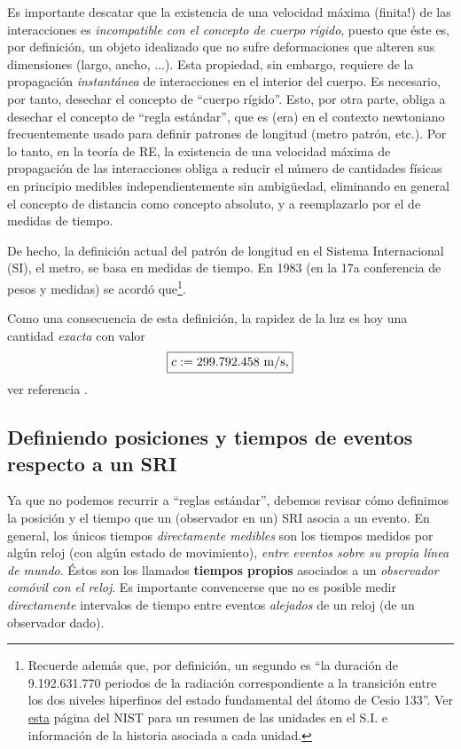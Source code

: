 Es importante descatar que la existencia de una velocidad máxima (finita!) de las interacciones es \textit{incompatible con el concepto de
cuerpo rígido}, puesto que éste es, por definición, un objeto idealizado
que no sufre deformaciones que alteren sus dimensiones (largo, ancho, ...).
Esta propiedad, sin embargo, requiere de la propagación \textit{instantánea} de interacciones en el interior del cuerpo. Es necesario, por tanto, desechar el concepto de ``cuerpo
rígido''. Esto, por otra parte, obliga a desechar el concepto de ``regla
estándar'', que es (era) en el contexto newtoniano frecuentemente usado para definir patrones de longitud (metro patrón, etc.). 
Por lo tanto, en la teoría de RE, la existencia de una velocidad máxima de propagación de las interacciones obliga a reducir el número de cantidades físicas en principio medibles independientemente sin ambig\"uedad, eliminando en general el concepto de distancia como concepto absoluto, y a reemplazarlo por el de medidas de tiempo.

De hecho, la definición actual del patrón de longitud en el Sistema
Internacional (SI), el metro, se basa en medidas de tiempo. En 1983 (en la 17a
conferencia de pesos y medidas) se acordó que\footnote{Recuerde además que, por definición, un segundo es ``la duración de 9.192.631.770 periodos de la radiación correspondiente a la transición entre los dos niveles hiperfinos del estado fundamental del átomo de Cesio 133''. Ver \href{http://physics.nist.gov/cuu/Units/current.html}{esta} página del NIST para un resumen de las unidades en el S.I. e información de la historia asociada a cada unidad.}.
\begin{quotation}
\end{quotation}
Como una consecuencia de esta definición, la rapidez de la luz es hoy una
cantidad \textit{exacta} con valor
\begin{equation}
\boxed{c:=299.792.458\rm\ m/s,}
\end{equation}
ver referencia \cite{CODATA00}.

\subsection{Definiendo posiciones y tiempos de eventos respecto a un SRI}

Ya que no podemos recurrir a ``reglas estándar'', debemos revisar cómo definimos la posición y el tiempo que un (observador en un) SRI asocia a un evento. En general, los únicos tiempos \textit{directamente medibles} son los tiempos medidos por algún reloj (con algún estado de movimiento), \textit{entre eventos sobre su propia línea de mundo}. Éstos son los llamados \textbf{tiempos propios} asociados a un \textit{observador comóvil con el reloj}. Es importante convencerse que no es posible medir \textit{directamente} intervalos de tiempo entre eventos \textit{alejados} de un reloj (de un observador dado).

